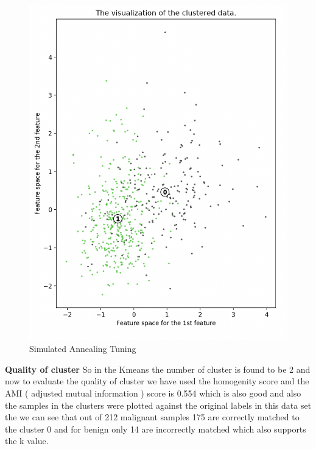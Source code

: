 \documentclass[a4paper,12pt]{article}
\begin{document}
\begin{figure}[!htb]
\begin{minipage}{0.33\textwidth}
     \end{minipage}\hfill
     \begin{minipage}{0.33\textwidth}
     \centering
     \includegraphics[width=.95\linewidth]{sil_kmeans_12}
   \end{minipage}\hfill
 \caption { Simulated Annealing Tuning}
\end{figure}


\textbf{ Quality of cluster} So in the Kmeans the number of cluster is found to be 2 and now to evaluate the quality of cluster we have used the homogenity score and the AMI ( adjusted mutual information ) score is 0.554 which is also good and also the samples in the clusters were plotted against the original labels in this data set the we can see that out of 212 malignant samples 175 are correctly matched to the cluster 0 and for benign only 14 are incorrectly matched which also supports the k value.
\end{document}

